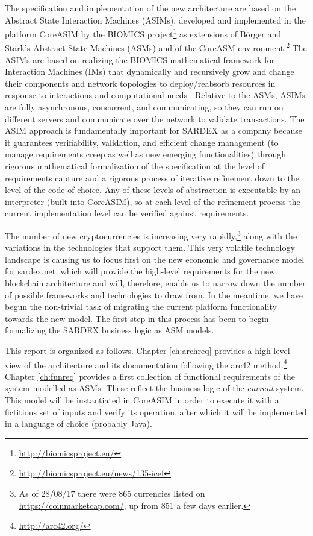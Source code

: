 The specification and implementation of the new architecture are based on the Abstract State Interaction Machines (ASIMs), developed and implemented in the platform CoreASIM by the BIOMICS project\footnote{\url{http://biomicsproject.eu/}} \cite{BIOMICSD41,BIOMICSD42,BIOMICSD52} as extensions of B\"orger and St\"ark's \cite{BoergerStaerk2003} Abstract State Machines (ASMs) and of the CoreASM environment.\footnote{\url{http://biomicsproject.eu/news/135-icef}} The ASIMs are based on realizing the BIOMICS mathematical framework for Interaction Machines (IMs) that dynamically and recursively grow and change their components and network topologies to deploy/reabsorb resources in response to interactions and computational needs \cite{NehanivEtAl2015}. Relative to the ASMs, ASIMs are fully asynchronous, concurrent, and communicating, so they can run on different servers and communicate over the network to validate transactions. The ASIM approach is fundamentally important for SARDEX as a company because it guarantees verifiability, validation, and efficient change management (to manage requirements creep as well as new emerging functionalities) through rigorous mathematical formalization of the specification at the level of requirements capture and a rigorous process of iterative refinement down to the level of the code of choice. Any of these levels of abstraction is executable by an interpreter (built into CoreASIM), so at each level of the refinement process the current implementation level can be verified against requirements.

The number of new cryptocurrencies is increasing very rapidly,\footnote{As of 28/08/17 there were 865 currencies listed on \url{https://coinmarketcap.com/}, up from 851 a few days earlier.} along with the variations in the technologies that support them. This very volatile technology landscape is causing us to focus first on the new economic and governance model for sardex.net, which will provide the high-level requirements for the new blockchain architecture and will, therefore, enable us to narrow down the number of possible frameworks and technologies to draw from. In the meantime, we have begun the non-trivial task of migrating the current platform functionality towards the new model. The first step in this process has been to begin formalizing the SARDEX business logic as ASM models.

This report is organized as follows. Chapter \ref{ch:archreq} provides a high-level view of the architecture and its documentation following the arc42 method.\footnote{\url{http://arc42.org/}} Chapter \ref{ch:funreq} provides a first collection of functional requirements of the system modelled as ASMs. These reflect the business logic of the \emph{current} system. This model will be instantiated in CoreASIM in order to execute it with a fictitious set of inputs and verify its operation, after which it will be implemented in a language of choice (probably Java).

